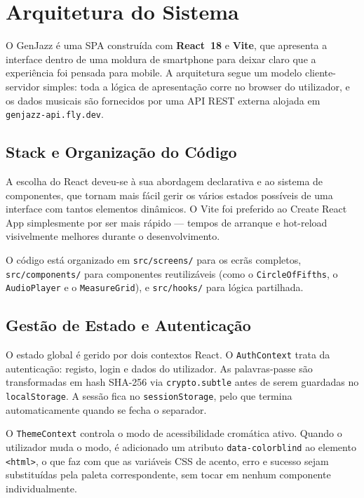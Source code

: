 \chapter{Arquitetura do Sistema}
\label{chap:arquitetura}

O GenJazz é uma \ac{SPA} construída com \textbf{React~18} e \textbf{Vite}, que apresenta a interface dentro de uma moldura de smartphone para deixar claro que a experiência foi pensada para mobile. A arquitetura segue um modelo cliente-servidor simples: toda a lógica de apresentação corre no browser do utilizador, e os dados musicais são fornecidos por uma API REST externa alojada em \texttt{genjazz-api.fly.dev}.

\section{Stack e Organização do Código}
\label{chap2:sec:stack}

A escolha do React deveu-se à sua abordagem declarativa e ao sistema de componentes, que tornam mais fácil gerir os vários estados possíveis de uma interface com tantos elementos dinâmicos. O Vite foi preferido ao Create React App simplesmente por ser mais rápido --- tempos de arranque e hot-reload visivelmente melhores durante o desenvolvimento.

O código está organizado em \texttt{src/screens/} para os ecrãs completos, \texttt{src/components/} para componentes reutilizáveis (como o \texttt{CircleOfFifths}, o \texttt{AudioPlayer} e o \texttt{MeasureGrid}), e \texttt{src/hooks/} para lógica partilhada.

\section{Gestão de Estado e Autenticação}
\label{chap2:sec:estado}

O estado global é gerido por dois contextos React. O \texttt{AuthContext} trata da autenticação: registo, login e dados do utilizador. As palavras-passe são transformadas em hash SHA-256 via \texttt{crypto.subtle} antes de serem guardadas no \texttt{localStorage}. A sessão fica no \texttt{sessionStorage}, pelo que termina automaticamente quando se fecha o separador.

O \texttt{ThemeContext} controla o modo de acessibilidade cromática ativo. Quando o utilizador muda o modo, é adicionado um atributo \texttt{data-colorblind} ao elemento \texttt{<html>}, o que faz com que as variáveis CSS de acento, erro e sucesso sejam substituídas pela paleta correspondente, sem tocar em nenhum componente individualmente.

